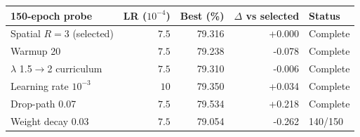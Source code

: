 \begin{tabular}{lrrrl}
\toprule
150-epoch probe & LR ($10^{-4}$) & Best (\%) & $\Delta$ vs selected & Status \\
\midrule
Spatial $R=3$ (selected) & $7.5$ & 79.316 & +0.000 & Complete \\
Warmup 20 & $7.5$ & 79.238 & -0.078 & Complete \\
$\lambda$ 1.5$\to$2 curriculum & $7.5$ & 79.310 & -0.006 & Complete \\
Learning rate $10^{-3}$ & $10$ & 79.350 & +0.034 & Complete \\
Drop-path 0.07 & $7.5$ & 79.534 & +0.218 & Complete \\
Weight decay 0.03 & $7.5$ & 79.054 & -0.262 & 140/150 \\
\bottomrule
\end{tabular}
